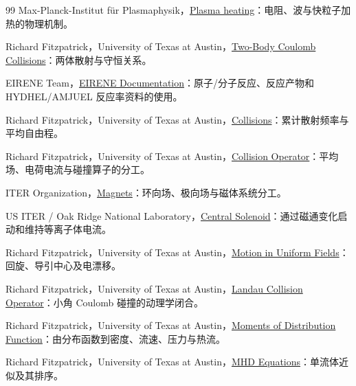 \documentclass[12pt,fontset=none]{ctexart}
\numberwithin{equation}{section}
\numberwithin{table}{section}
\numberwithin{figure}{section}
\begin{document}
\clearpage
{}
{}
\renewcommand{\refname}{参考文献}
\begin{thebibliography}{99}
\small
{}
Max-Planck-Institut f\"ur Plasmaphysik，\href{https://www.ipp.mpg.de/15108/plasmaheizung}{Plasma heating}：电阻、波与快粒子加热的物理机制。

Richard Fitzpatrick，University of Texas at Austin，\href{https://farside.ph.utexas.edu/teaching/plasma/lectures1/node35.html}{Two-Body Coulomb Collisions}：两体散射与守恒关系。

EIRENE Team，\href{https://www.eirene.de/Documentation/eirene.pdf}{EIRENE Documentation}：原子/分子反应、反应产物和 HYDHEL/AMJUEL 反应率资料的使用。

Richard Fitzpatrick，University of Texas at Austin，\href{https://farside.ph.utexas.edu/teaching/plasma/Plasma/node8.html}{Collisions}：累计散射频率与平均自由程。

Richard Fitzpatrick，University of Texas at Austin，\href{https://farside.ph.utexas.edu/teaching/plasma/Plasma/node31.html}{Collision Operator}：平均场、电荷电流与碰撞算子的分工。

ITER Organization，\href{https://www.iter.org/machine/magnets}{Magnets}：环向场、极向场与磁体系统分工。

US ITER / Oak Ridge National Laboratory，\href{https://usiter.ornl.gov/hardware/central-solenoid/}{Central Solenoid}：通过磁通变化启动和维持等离子体电流。

Richard Fitzpatrick，University of Texas at Austin，\href{https://farside.ph.utexas.edu/teaching/plasma/lectures1/node16.html}{Motion in Uniform Fields}：回旋、导引中心及电漂移。

Richard Fitzpatrick，University of Texas at Austin，\href{https://farside.ph.utexas.edu/teaching/plasma/lectures1/node37.html}{Landau Collision Operator}：小角 Coulomb 碰撞的动理学闭合。

Richard Fitzpatrick，University of Texas at Austin，\href{https://farside.ph.utexas.edu/teaching/plasma/lectures1/node47.html}{Moments of Distribution Function}：由分布函数到密度、流速、压力与热流。

Richard Fitzpatrick，University of Texas at Austin，\href{https://farside.ph.utexas.edu/teaching/plasma/lectures1/node59.html}{MHD Equations}：单流体近似及其排序。


\end{thebibliography}
\end{document}
